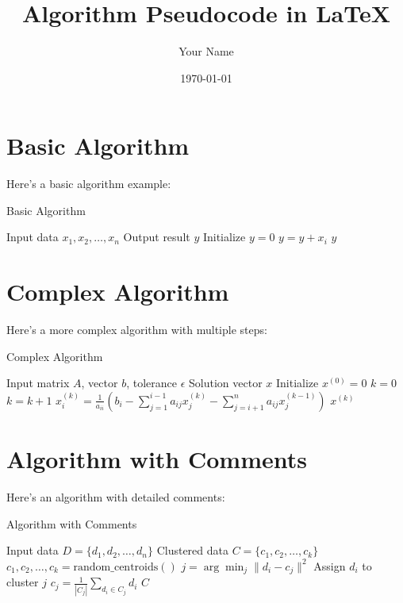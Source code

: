 \documentclass{article}
\title{Algorithm Pseudocode in LaTeX}
\author{Your Name}
\date{\today}
\begin{document}
\maketitle

\section{Basic Algorithm}
Here's a basic algorithm example:

\begin{algorithm}
\caption{Basic Algorithm}
\label{alg:basic}
\begin{algorithmic}[1]
\Require Input data $x_1, x_2, \ldots, x_n$
\Ensure Output result $y$
\State Initialize $y = 0$
    \State $y = y + x_i$
\EndFor
\Return $y$
\end{algorithmic}
\end{algorithm}

\section{Complex Algorithm}
Here's a more complex algorithm with multiple steps:

\begin{algorithm}
\caption{Complex Algorithm}
\label{alg:complex}
\begin{algorithmic}[1]
\Require Input matrix $A$, vector $b$, tolerance $\epsilon$
\Ensure Solution vector $x$
\State Initialize $x^{(0)} = 0$
\State $k = 0$
\Repeat
    \State $k = k + 1$
        \State $x_i^{(k)} = \frac{1}{a_{ii}}\left(b_i - \sum_{j=1}^{i-1} a_{ij}x_j^{(k)} - \sum_{j=i+1}^{n} a_{ij}x_j^{(k-1)}\right)$
    \EndFor
{}
\Return $x^{(k)}$
\end{algorithmic}
\end{algorithm}

\section{Algorithm with Comments}
Here's an algorithm with detailed comments:

\begin{algorithm}
\caption{Algorithm with Comments}
\label{alg:comments}
\begin{algorithmic}[1]
\Require Input data $D = \{d_1, d_2, \ldots, d_n\}$
\Ensure Clustered data $C = \{c_1, c_2, \ldots, c_k\}$
\State {}
\State $c_1, c_2, \ldots, c_k = \text{random\_centroids}()$
\State {}
\Repeat
    \State {}
        \State $j = \arg\min_{j} \|d_i - c_j\|^2$
        \State Assign $d_i$ to cluster $j$
    \EndFor
    \State {}
        \State $c_j = \frac{1}{|C_j|} \sum_{d_i \in C_j} d_i$
    \EndFor
{}
\Return $C$
\end{algorithmic}
\end{algorithm}
\end{document}
